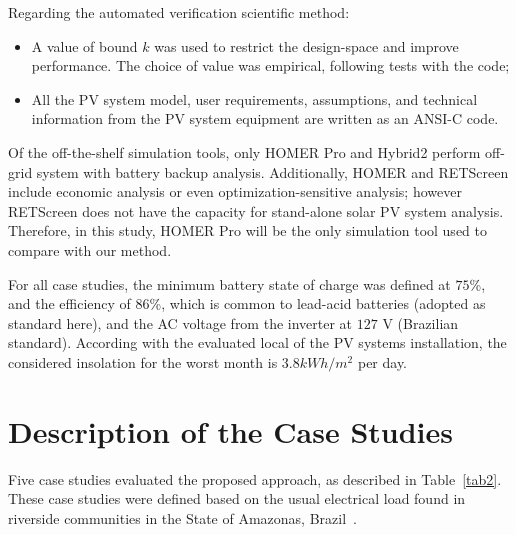 Regarding the automated verification scientific method:

\begin{itemize}
\item A value of bound $k$ was used to restrict the design-space and improve performance. The choice of value was empirical, following tests with the code;
\item All the PV system model, user requirements, assumptions, and technical information from the PV system equipment are written as an ANSI-C code.
\end{itemize}

Of the off-the-shelf simulation tools, only HOMER Pro and Hybrid2 perform off-grid system with battery backup analysis. Additionally, HOMER and RETScreen include economic analysis or even optimization-sensitive analysis; however RETScreen does not have the capacity for stand-alone solar PV system analysis. Therefore, in this study, HOMER Pro will be the only simulation tool used to compare with our method.  

For all case studies, the minimum battery state of charge was defined at $75$\%, and the efficiency of $86$\%, which is common to lead-acid batteries (adopted as standard here), and the AC voltage from the inverter at $127$ V (Brazilian standard). According with the evaluated local of the PV systems installation, the considered insolation for the worst month is $3.8 kWh/m^{2}$ per day.


\section{Description of the Case Studies}

Five case studies evaluated the proposed approach, as described in Table~\ref{tab2}. %
These case studies were defined based on the usual electrical load found in riverside communities in the State of Amazonas,  Brazil~\cite{TrindadeCordeiro19, Agrener2013}.

